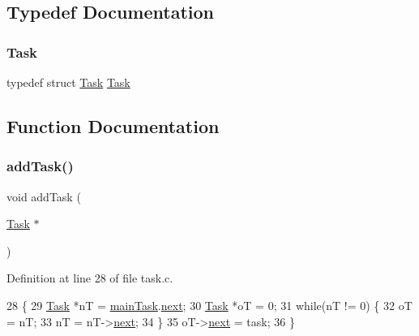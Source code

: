 \subsection{Typedef Documentation}
\mbox{\label{a00047_a7a90fbdcc84682f027affec67944111b_a7a90fbdcc84682f027affec67944111b}} 
\subsubsection{\texorpdfstring{Task}{Task}}
{\footnotesize\ttfamily typedef struct \hyperlink{a00134}{Task}  \hyperlink{a00134}{Task}}



\subsection{Function Documentation}
\mbox{\label{a00047_a077ea59d35297d9fb3fa4675beefbd79_a077ea59d35297d9fb3fa4675beefbd79}} 
\subsubsection{\texorpdfstring{add\+Task()}{addTask()}}
{\footnotesize\ttfamily void add\+Task (\begin{DoxyParamCaption}\item[{\hyperlink{a00134}{Task} $\ast$}]{ }\end{DoxyParamCaption})}



Definition at line 28 of file task.\+c.


\begin{DoxyCode}
28                          \{
29     \hyperlink{a00134}{Task} *nT = \hyperlink{a00044_a228ac88416ebaa8713846e3e5e3e9b6d_a228ac88416ebaa8713846e3e5e3e9b6d}{mainTask}.\hyperlink{a00134_a8b6b50960a19f7bae344ef0cc8ec4e7d_a8b6b50960a19f7bae344ef0cc8ec4e7d}{next};
30     \hyperlink{a00134}{Task} *oT = 0;
31     \textcolor{keywordflow}{while}(nT != 0) \{
32         oT = nT;
33         nT = nT->\hyperlink{a00134_a8b6b50960a19f7bae344ef0cc8ec4e7d_a8b6b50960a19f7bae344ef0cc8ec4e7d}{next};
34     \}
35     oT->\hyperlink{a00134_a8b6b50960a19f7bae344ef0cc8ec4e7d_a8b6b50960a19f7bae344ef0cc8ec4e7d}{next} = task;
36 \}
\end{DoxyCode}
\mbox{\label{a00047_a3abb1d0cc6fd9ea5a5b860f36bc81d6a_a3abb1d0cc6fd9ea5a5b860f36bc81d6a}} 
